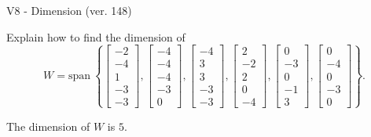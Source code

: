 \begin{exercise}
  \begin{exerciseTitle}V8 - Dimension (ver. 148)\end{exerciseTitle}
  \begin{exerciseStatement}
    Explain how to find the dimension of 
\[W=\mathrm{span}\ \left\{\left[\begin{array}{r}
-2 \\
-4 \\
1 \\
-3 \\
-3
\end{array}\right] , \left[\begin{array}{r}
-4 \\
-4 \\
-4 \\
-3 \\
0
\end{array}\right] , \left[\begin{array}{r}
-4 \\
3 \\
3 \\
-3 \\
-3
\end{array}\right] , \left[\begin{array}{r}
2 \\
-2 \\
2 \\
0 \\
-4
\end{array}\right] , \left[\begin{array}{r}
0 \\
-3 \\
0 \\
-1 \\
3
\end{array}\right] , \left[\begin{array}{r}
0 \\
-4 \\
0 \\
-3 \\
0
\end{array}\right]\right\}.\]



  \end{exerciseStatement}
  \begin{exerciseAnswer}
   The dimension of \(W\) is  \(5\).
  


  \end{exerciseAnswer}
\end{exercise}